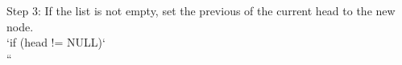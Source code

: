 \documentclass[preview]{standalone}
\begin{document}
Step 3: If the list is not empty, set the previous of the current head to the new node.\\`if (head != NULL)`\\``\\
\end{document}

